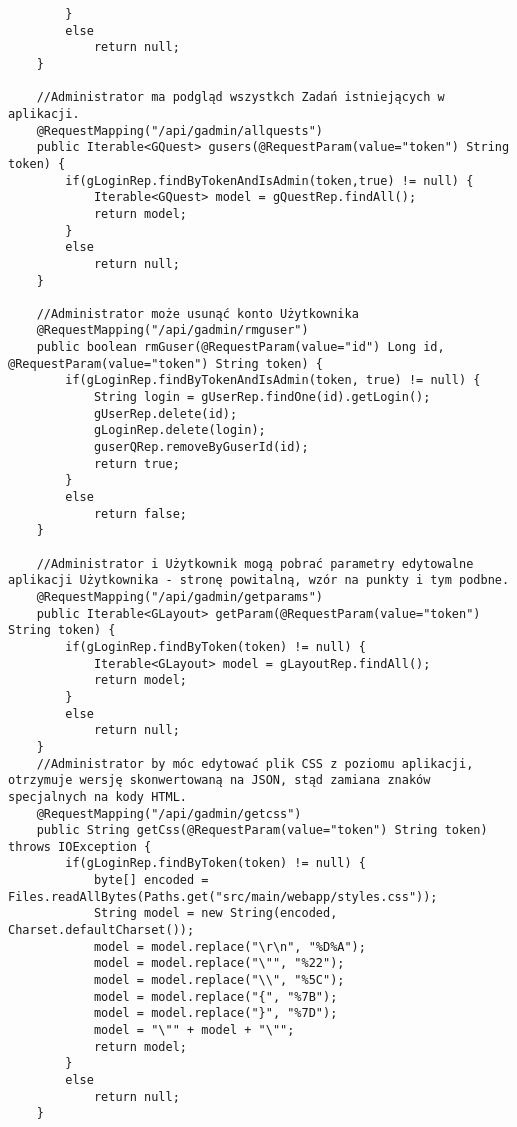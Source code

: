 \documentclass[a4paper,12pt,twoside,openany]{report}
\begin{document}
\begin{lstlisting}
        }
        else
            return null;
    }
    
	//Administrator ma podgląd wszystkch Zadań istniejących w aplikacji.
    @RequestMapping("/api/gadmin/allquests")
    public Iterable<GQuest> gusers(@RequestParam(value="token") String token) {
        if(gLoginRep.findByTokenAndIsAdmin(token,true) != null) {
            Iterable<GQuest> model = gQuestRep.findAll();
            return model;
        }
        else
            return null;
    }
	
	//Administrator może usunąć konto Użytkownika
    @RequestMapping("/api/gadmin/rmguser")
    public boolean rmGuser(@RequestParam(value="id") Long id, @RequestParam(value="token") String token) {
        if(gLoginRep.findByTokenAndIsAdmin(token, true) != null) {
            String login = gUserRep.findOne(id).getLogin();
            gUserRep.delete(id);
            gLoginRep.delete(login);
            guserQRep.removeByGuserId(id);
            return true;
        }
        else
            return false;
    }
    
	//Administrator i Użytkownik mogą pobrać parametry edytowalne aplikacji Użytkownika - stronę powitalną, wzór na punkty i tym podbne.
    @RequestMapping("/api/gadmin/getparams")
    public Iterable<GLayout> getParam(@RequestParam(value="token") String token) {
        if(gLoginRep.findByToken(token) != null) {
            Iterable<GLayout> model = gLayoutRep.findAll();
            return model;
        }
        else
            return null;
    }
    //Administrator by móc edytować plik CSS z poziomu aplikacji, otrzymuje wersję skonwertowaną na JSON, stąd zamiana znaków specjalnych na kody HTML. 
    @RequestMapping("/api/gadmin/getcss")
    public String getCss(@RequestParam(value="token") String token) throws IOException {
        if(gLoginRep.findByToken(token) != null) {
            byte[] encoded = Files.readAllBytes(Paths.get("src/main/webapp/styles.css"));
            String model = new String(encoded, Charset.defaultCharset());
            model = model.replace("\r\n", "%D%A");
            model = model.replace("\"", "%22");
            model = model.replace("\\", "%5C");
            model = model.replace("{", "%7B");
            model = model.replace("}", "%7D");
            model = "\"" + model + "\"";
            return model;
        }
        else
            return null;
    }
    

\end{lstlisting}
\end{document}
